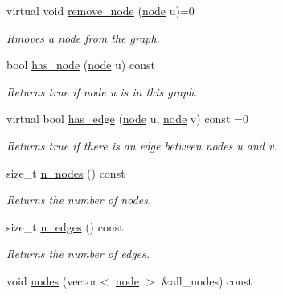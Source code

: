 \begin{DoxyCompactItemize}
virtual void \hyperlink{classlgraph_1_1utils_1_1xxgraph_a082e0000394dbf3b0bc5d3976baff593}{remove\-\_\-node} (\hyperlink{namespacelgraph_1_1utils_a7bd66ede3805ef121bc2835bd48de0cf}{node} u)=0
\begin{DoxyCompactList}\small\item\em Rmoves a node from the graph. \end{DoxyCompactList}\item 
\hypertarget{classlgraph_1_1utils_1_1xxgraph_a026ab064c2be26790cc1f547be2157c9}{bool \hyperlink{classlgraph_1_1utils_1_1xxgraph_a026ab064c2be26790cc1f547be2157c9}{has\-\_\-node} (\hyperlink{namespacelgraph_1_1utils_a7bd66ede3805ef121bc2835bd48de0cf}{node} u) const }\label{classlgraph_1_1utils_1_1xxgraph_a026ab064c2be26790cc1f547be2157c9}

\begin{DoxyCompactList}\small\item\em Returns true if node {\itshape u} is in this graph. \end{DoxyCompactList}\item 
virtual bool \hyperlink{classlgraph_1_1utils_1_1xxgraph_a9e94100afc70b09049432f196550407c}{has\-\_\-edge} (\hyperlink{namespacelgraph_1_1utils_a7bd66ede3805ef121bc2835bd48de0cf}{node} u, \hyperlink{namespacelgraph_1_1utils_a7bd66ede3805ef121bc2835bd48de0cf}{node} v) const =0
\begin{DoxyCompactList}\small\item\em Returns true if there is an edge between nodes {\itshape u} and {\itshape v}. \end{DoxyCompactList}\item 
size\-\_\-t \hyperlink{classlgraph_1_1utils_1_1xxgraph_ad345f1fbf1dee34e1579b5aea9aef9b2}{n\-\_\-nodes} () const 
\begin{DoxyCompactList}\small\item\em Returns the number of nodes. \end{DoxyCompactList}\item 
size\-\_\-t \hyperlink{classlgraph_1_1utils_1_1xxgraph_af3f7c3835406c2cbf70479ae1c0253c9}{n\-\_\-edges} () const 
\begin{DoxyCompactList}\small\item\em Returns the number of edges. \end{DoxyCompactList}\item 
\hypertarget{classlgraph_1_1utils_1_1xxgraph_a99f83387aa9f59b861e675251be5a3ad}{void \hyperlink{classlgraph_1_1utils_1_1xxgraph_a99f83387aa9f59b861e675251be5a3ad}{nodes} (vector$<$ \hyperlink{namespacelgraph_1_1utils_a7bd66ede3805ef121bc2835bd48de0cf}{node} $>$ \&all\-\_\-nodes) const }\label{classlgraph_1_1utils_1_1xxgraph_a99f83387aa9f59b861e675251be5a3ad}


\end{DoxyCompactItemize}
